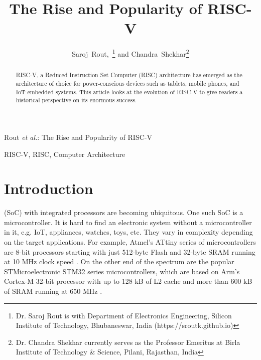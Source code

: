 \documentclass[journal]{IEEEtran}
\begin{document}
%
\title{The Rise and Popularity of RISC-V}
%
\author{Saroj~Rout,~\thanks{Dr. Saroj Rout is with Department of Electronics Engineering, Silicon Institute of Technology, Bhubaneswar, India (https://sroutk.github.io)} and Chandra~Shekhar\thanks{Dr. Chandra Shekhar currently serves as the Professor Emeritus at Birla Institute of Technology \& Science, Pilani, Rajasthan, India} }

%
{Rout \MakeLowercase{\textit{et al.}}: The Rise and Popularity of RISC-V}

\maketitle

\begin{abstract}

RISC-V, a Reduced Instruction Set Computer (RISC) architecture has emerged as the architecture of choice for power-conscious devices such as tablets, mobile phones, and IoT embedded systems. This article looks at the evolution of RISC-V to give readers a historical perspective on its enormous success.  

\end{abstract}



\begin{IEEEkeywords}
RISC-V, RISC, Computer Architecture
\end{IEEEkeywords}

\section{Introduction}

 (SoC) with integrated processors are becoming ubiquitous. One such SoC is a microcontroller. It is hard to find an electronic system without a microcontroller in it, e.g. IoT, appliances, watches, toys, etc. They vary in complexity depending on the target applications. For example, Atmel's ATtiny series of microcontrollers are 8-bit processors starting with just 512-byte Flash and 32-byte SRAM running at 10 MHz clock speed \cite{microchip_attiny85_nodate}. On the other end of the spectrum are the popular STMicroelectronic STM32 series microcontrollers, which are based on Arm's Cortex-M 32-bit processor with up to 128 kB of L2 cache and more than 600 kB of SRAM running at 650 MHz \cite{stmicroelectronics_stm32_nodate}.
\end{document}
